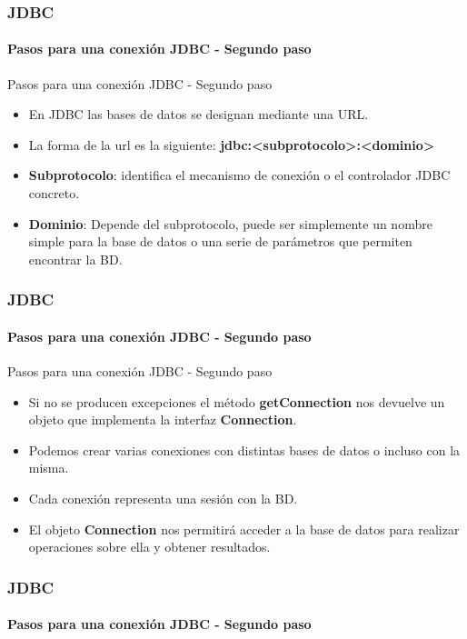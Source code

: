 \documentclass{beamer}
\begin{document}
	\begin{frame}
		\frametitle{JDBC}
		\framesubtitle{Pasos para una conexi\'on JDBC - Segundo paso}

        \begin{exampleblock}{Pasos para una conexi\'on JDBC - Segundo paso}
		    \begin{itemize}
		        \item En JDBC las bases de datos se designan mediante una URL.
		        \item La forma de la url es la siguiente: \textbf{jdbc:<subprotocolo>:<dominio>}
		        \item \textbf{Subprotocolo}: identifica el mecanismo de conexi\'on o el controlador JDBC concreto.
		        \item \textbf{Dominio}: Depende del subprotocolo, puede ser simplemente un nombre simple para la base de datos o una serie de par\'ametros que permiten encontrar la BD.
		    \end{itemize}
		    \end{exampleblock}
	\end{frame}
  
	\begin{frame}
		\frametitle{JDBC}
		\framesubtitle{Pasos para una conexi\'on JDBC - Segundo paso}

        \begin{exampleblock}{Pasos para una conexi\'on JDBC - Segundo paso}
		    \begin{itemize}
		        \item Si no se producen excepciones el m\'etodo \textbf{getConnection} nos devuelve un objeto que implementa la interfaz \textbf{Connection}.
		        \item Podemos crear varias conexiones con distintas bases de datos o incluso con la misma.
		        \item Cada conexi\'on representa una sesi\'on con la BD.
		        \item El objeto \textbf{Connection} nos permitir\'a acceder a la base de datos para realizar operaciones sobre ella y obtener resultados.
		    \end{itemize}
		    \end{exampleblock}
	\end{frame}  
  
	\begin{frame}
		\frametitle{JDBC}
		\framesubtitle{Pasos para una conexi\'on JDBC - Segundo paso}

               
	\end{frame}
\end{document}
